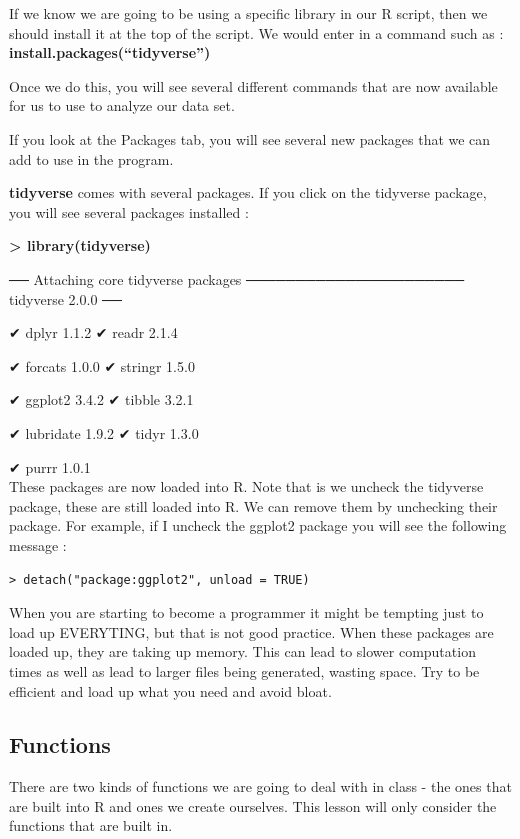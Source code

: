 \documentclass[
  letterpaper,
  DIV=11,
  numbers=noendperiod]{scrreprt}
\begin{document}
If we know we are going to be using a specific library in our R script,
then we should install it at the top of the script. We would enter in a
command such as : \textbf{install.packages(``tidyverse'')}

Once we do this, you will see several different commands that are now
available for us to use to analyze our data set.

If you look at the Packages tab, you will see several new packages that
we can add to use in the program.

\textbf{tidyverse} comes with several packages. If you click on the
tidyverse package, you will see several packages installed :

\textbf{\textgreater{} library(tidyverse)}

── Attaching core tidyverse packages ────────────────────── tidyverse
2.0.0 ──

✔ dplyr 1.1.2 ✔ readr 2.1.4

✔ forcats 1.0.0 ✔ stringr 1.5.0

✔ ggplot2 3.4.2 ✔ tibble 3.2.1

✔ lubridate 1.9.2 ✔ tidyr 1.3.0

✔ purrr 1.0.1\\

These packages are now loaded into R. Note that is we uncheck the
tidyverse package, these are still loaded into R. We can remove them by
unchecking their package. For example, if I uncheck the ggplot2 package
you will see the following message :

\texttt{\textgreater{}\ detach("package:ggplot2",\ unload\ =\ TRUE)}

When you are starting to become a programmer it might be tempting just
to load up EVERYTING, but that is not good practice. When these packages
are loaded up, they are taking up memory. This can lead to slower
computation times as well as lead to larger files being generated,
wasting space. Try to be efficient and load up what you need and avoid
bloat.

\subsection*{Functions}\label{functions}

There are two kinds of functions we are going to deal with in class -
the ones that are built into R and ones we create ourselves. This lesson
will only consider the functions that are built in.
\end{document}
